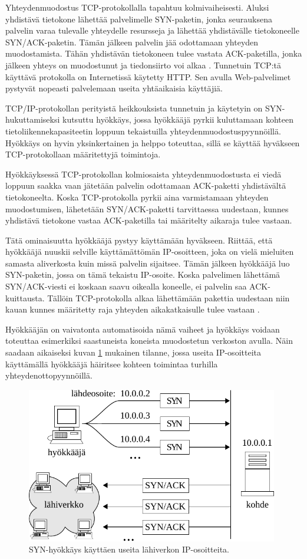 Yhteydenmuodostus TCP-protokollalla tapahtuu kolmivaiheisesti. Aluksi
yhdistävä tietokone lähettää palvelimelle SYN-paketin, jonka
seurauksena palvelin varaa tulevalle yhteydelle resursseja ja lähettää
yhdistävälle tietokoneelle SYN/ACK-paketin. Tämän jälkeen palvelin
jää odottamaan yhteyden muodostamista. Tähän yhdistävän tietokoneen
tulee vastata ACK-paketilla, jonka jälkeen yhteys on muodostunut ja
tiedonsiirto voi alkaa \cite{Hacking}. Tunnetuin TCP:tä käyttävä
protokolla on Internetissä käytetty HTTP. Sen avulla Web-palvelimet
pystyvät nopeasti palvelemaan useita yhtäaikaisia käyttäjiä.

TCP/IP-protokollan perityistä heikkouksista tunnetuin ja
käytetyin on SYN-hu\-kut\-ta\-mi\-sek\-si kutsuttu hyökkäys, jossa hyökkääjä
pyrkii kuluttamaan kohteen tietoliikennekapasiteetin loppuun
tekaistuilla yhteydenmuodostuspyynnöillä. Hyökkäys on hyvin
yksinkertainen ja helppo toteuttaa, sillä se käyttää hyväkseen
TCP-protokollaan määritettyjä toimintoja. 

Hyökkäyksessä TCP-protokollan kolmiosaista yhteydenmuodostusta ei viedä loppuun
saakka vaan jätetään palvelin odottamaan ACK-paketti yhdistävältä
tietokoneelta. Koska TCP-protokolla pyrkii aina varmistamaan yhteyden muodostumisen,
lähetetään SYN/ACK-paketti tarvittaessa uudestaan, kunnes yhdistävä
tietokone vastaa ACK-paketilla tai määritelty aikaraja tulee
vastaan. 

Tätä ominaisuutta hyökkääjä pystyy käyttämään
hyväkseen. Riittää, että hyökkääjä nuuskii selville käyttämättömän
IP-osoitteen, joka on vielä mieluiten samasta aliverkosta kuin missä
palvelin sijaitsee. Tämän jälkeen hyökkääjä luo SYN-paketin, jossa on
tämä tekaistu IP-osoite. Koska palvelimen lähettämä SYN/ACK-viesti ei
koskaan saavu oikealla koneelle, ei palvelin saa ACK-kuittausta. Tällöin
TCP-pro\-to\-kol\-la alkaa lähettämään pakettia uudestaan niin kauan
kunnes määritetty raja yhteyden aikakatkaisulle tulee vastaan
\cite{STACK}. 

Hyökkääjän on vaivatonta automatisoida nämä vaiheet ja
hyökkäys voidaan toteuttaa esimerkiksi saastuneista koneista
muodostetun verkoston avulla. Näin saadaan aikaiseksi kuvan \ref{syn}
mukainen tilanne, jossa useita IP-osoitteita käyttämällä hyökkääjä
häiritsee kohteen toimintaa turhilla yhteydenottopyynnöillä.

\begin{figure}[h]
\centering
\includegraphics[width=11cm]{pics/syn.pdf}
\caption{SYN-hyökkäys käyttäen useita lähiverkon IP-osoitteita.}
\label{syn}
\end{figure}

